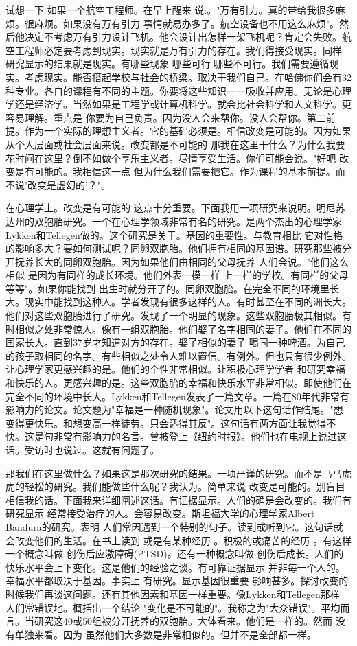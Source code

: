 试想一下 如果一个航空工程师。在早上醒来 说:。"万有引力。真的带给我很多麻烦。很麻烦。如果没有万有引力 事情就易办多了。航空设备也不用这么麻烦"。然后他决定不考虑万有引力设计飞机。他会设计出怎样一架飞机呢？肯定会失败。航空工程师必定要考虑到现实。现实就是万有引力的存在。我们得接受现实。同样 研究显示的结果就是现实。有哪些现象 哪些可行 哪些不可行。我们需要遵循现实。考虑现实。能否搭起学校与社会的桥梁。取决于我们自己。在哈佛你们会有32种专业。各自的课程有不同的主题。你要将这些知识一一吸收并应用。无论是心理学还是经济学。当然如果是工程学或计算机科学。就会比社会科学和人文科学。更容易理解。重点是 你要为自己负责。因为没人会来帮你。没人会帮你。第二前提。作为一个实际的理想主义者。它的基础必须是。相信改变是可能的。因为如果从个人层面或社会层面来说。改变都是不可能的 那我在这里干什么？为什么我要花时间在这里？倒不如做个享乐主义者。尽情享受生活。你们可能会说。"好吧 改变是有可能的。我相信这一点 但为什么我们需要把它。作为课程的基本前提。而不说'改变是虚幻的'？"。 

在心理学上。改变是有可能的 这点十分重要。下面我用一项研究来说明。明尼苏达州的双胞胎研究。一个在心理学领域非常有名的研究。是两个杰出的心理学家Lykken和Tellegen做的。这个研究是关于。基因的重要性。与教育相比 它对性格的影响多大？要如何测试呢？同卵双胞胎。他们拥有相同的基因谱。研究那些被分开抚养长大的同卵双胞胎。因为如果他们由相同的父母抚养 人们会说。"他们这么相似 是因为有同样的成长环境。他们外表一模一样 上一样的学校。有同样的父母 等等"。如果你能找到 出生时就分开了的。同卵双胞胎。在完全不同的环境里长大。现实中能找到这种人。学者发现有很多这样的人。有时甚至在不同的洲长大。他们对这些双胞胎进行了研究。发现了一个明显的现象。这些双胞胎极其相似。有时相似之处非常惊人。像有一组双胞胎。他们娶了名字相同的妻子。他们在不同的国家长大。直到37岁才知道对方的存在。娶了相似的妻子 喝同一种啤酒。为自己的孩子取相同的名字。有些相似之处令人难以置信。有例外。但也只有很少例外。让心理学家更感兴趣的是。他们的个性非常相似。让积极心理学学者 和研究幸福和快乐的人。更感兴趣的是。这些双胞胎的幸福和快乐水平非常相似。即使他们在完全不同的环境中长大。Lykken和Tellegen发表了一篇文章。一篇在80年代非常有影响力的论文。论文题为"幸福是一种随机现象"。论文用以下这句话作结尾。"想变得更快乐。和想变高一样徒劳。只会适得其反"。这句话有两方面让我觉得不快。这是句非常有影响力的名言。曾被登上《纽约时报》。他们也在电视上说过这话。受访时也说过。这就有问题了。 

那我们在这里做什么？如果这是那次研究的结果。一项严谨的研究。而不是马马虎虎的轻松的研究。我们能做些什么呢？我认为。简单来说 改变是可能的。别盲目相信我的话。下面我来详细阐述这话。有证据显示。人们的确是会改变的。我们有研究显示 经常接受治疗的人。会容易改变。斯坦福大学的心理学家Albert Bandura的研究。表明 人们常因遇到一个特别的句子。读到或听到它。这句话就会改变他们的生活。在书上读到 或是有某种经历-。积极的或痛苦的经历-。有这样一个概念叫做 创伤后应激障碍(PTSD)。还有一种概念叫做 创伤后成长。人们的快乐水平会上下变化。这是他们的经验之谈。有可靠证据显示 并非每一个人的。幸福水平都取决于基因。事实上 有研究。显示基因很重要 影响甚多。探讨改变的时候我们再谈这问题。还有其他因素和基因一样重要。像Lykken和Tellegen那样 人们常错误地。概括出一个结论 "变化是不可能的"。我称之为"大众错误"。平均而言。当研究这40或50组被分开抚养的双胞胎。大体看来。他们是一样的。然而 没有单独来看。因为 虽然他们大多数是非常相似的。但并不是全部都一样。 

